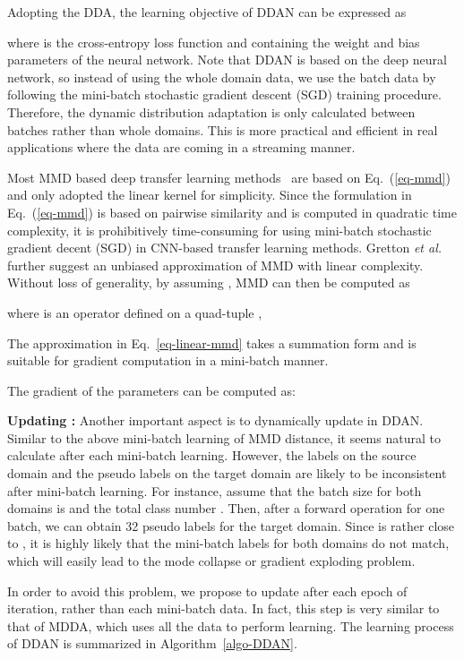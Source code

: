 \documentclass[acmsmall]{acmart}
\begin{document}
Adopting the DDA, the learning objective of DDAN can be expressed as


where  is the cross-entropy loss function and  containing the weight and bias parameters of the neural network. Note that DDAN is based on the deep neural network, so instead of using the whole domain data, we use the batch data by following the mini-batch stochastic gradient descent (SGD) training procedure. Therefore, the dynamic distribution adaptation is only calculated between batches rather than whole domains. This is more practical and efficient in real applications where the data are coming in a streaming manner.



Most MMD based deep transfer learning methods~\cite{tzeng2014deep} are based on Eq.~(\ref{eq-mmd}) and only adopted the linear kernel for simplicity. Since the formulation in Eq.~(\ref{eq-mmd}) is based on pairwise similarity and is computed in quadratic time complexity, it is prohibitively time-consuming for using mini-batch stochastic gradient decent (SGD) in CNN-based transfer learning methods. Gretton \textit{et al.}~\cite{gretton2012optimal} further suggest an unbiased approximation of MMD with linear complexity. Without loss of generality, by assuming , MMD can then be computed as

where  is an operator defined on a quad-tuple ,


The approximation in Eq.~\ref{eq-linear-mmd} takes a summation form and is suitable for gradient computation in a mini-batch manner.

The gradient of the parameters can be computed as:



\textbf{Updating :} Another important aspect is to dynamically update  in DDAN. Similar to the above mini-batch learning of MMD distance, it seems natural to calculate  after each mini-batch learning. However, the labels on the source domain and the pseudo labels on the target domain are likely to be inconsistent after mini-batch learning. For instance, assume that the batch size for both domains is  and the total class number . Then, after a forward operation for one batch, we can obtain 32 pseudo labels for the target domain. Since  is rather close to , it is highly likely that the mini-batch labels for both domains do not match, which will easily lead to the mode collapse or gradient exploding problem.

In order to avoid this problem, we propose to update  after each epoch of iteration, rather than each mini-batch data. In fact, this step is very similar to that of MDDA, which uses all the data to perform learning. The learning process of DDAN is summarized in Algorithm~\ref{algo-DDAN}.
\end{document}
